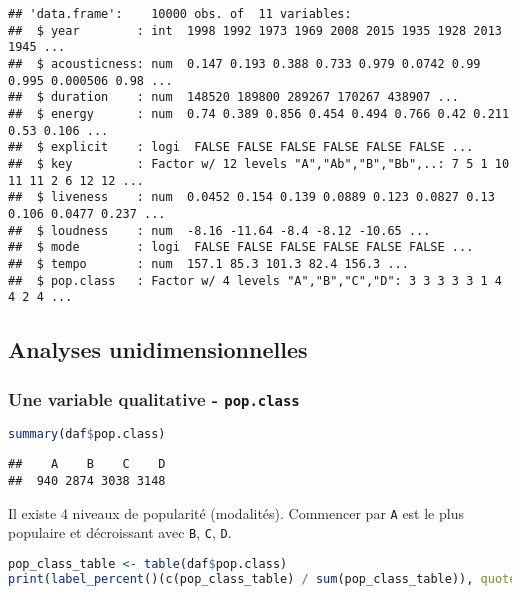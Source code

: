 \documentclass[
  12pt,
  xcolor = usenames,dvipsnames]{article}
\newcommand{\passthrough}[1]{#1}
\begin{document}
\begin{lstlisting}
## 'data.frame':    10000 obs. of  11 variables:
##  $ year        : int  1998 1992 1973 1969 2008 2015 1935 1928 2013 1945 ...
##  $ acousticness: num  0.147 0.193 0.388 0.733 0.979 0.0742 0.99 0.995 0.000506 0.98 ...
##  $ duration    : num  148520 189800 289267 170267 438907 ...
##  $ energy      : num  0.74 0.389 0.856 0.454 0.494 0.766 0.42 0.211 0.53 0.106 ...
##  $ explicit    : logi  FALSE FALSE FALSE FALSE FALSE FALSE ...
##  $ key         : Factor w/ 12 levels "A","Ab","B","Bb",..: 7 5 1 10 11 11 2 6 12 12 ...
##  $ liveness    : num  0.0452 0.154 0.139 0.0889 0.123 0.0827 0.13 0.106 0.0477 0.237 ...
##  $ loudness    : num  -8.16 -11.64 -8.4 -8.12 -10.65 ...
##  $ mode        : logi  FALSE FALSE FALSE FALSE FALSE FALSE ...
##  $ tempo       : num  157.1 85.3 101.3 82.4 156.3 ...
##  $ pop.class   : Factor w/ 4 levels "A","B","C","D": 3 3 3 3 3 1 4 4 2 4 ...
\end{lstlisting}

\hypertarget{analyses-unidimensionnelles}{%
\subsection{Analyses
unidimensionnelles}\label{analyses-unidimensionnelles}}

\hypertarget{une-variable-qualitative---pop.class}{%
\subsubsection{\texorpdfstring{Une variable qualitative -
\texttt{pop.class}}{Une variable qualitative - pop.class}}\label{une-variable-qualitative---pop.class}}

\begin{lstlisting}[language=R]
summary(daf$pop.class)
\end{lstlisting}

\begin{lstlisting}
##    A    B    C    D 
##  940 2874 3038 3148
\end{lstlisting}

Il existe 4 niveaux de popularité (modalités). Commencer par
\passthrough{\lstinline!A!} est le plus populaire et décroissant avec
\passthrough{\lstinline!B!}, \passthrough{\lstinline!C!},
\passthrough{\lstinline!D!}.

\begin{lstlisting}[language=R]
pop_class_table <- table(daf$pop.class)
print(label_percent()(c(pop_class_table) / sum(pop_class_table)), quote = F)
\end{lstlisting}
\end{document}
